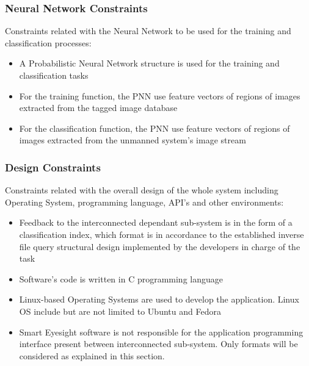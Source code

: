 \documentclass[12pt]{article}
\begin{document}
\subsubsection{Neural Network Constraints}
Constraints related with the Neural Network to be used for the
training and classification processes:
\begin{itemize}
\item A Probabilistic Neural Network structure is used for the
  training and classification tasks
\item For the training function, the PNN use feature vectors of
  regions of images extracted from the tagged image database
\item For the classification function, the PNN use feature vectors of
  regions of images extracted from the unmanned system's image stream
\end{itemize}

\subsubsection{Design Constraints}
Constraints related with the overall design of the whole system
including Operating System, programming language, API's and other
environments:
\begin{itemize}
\item Feedback to the interconnected dependant sub-system is in the
  form of a classification index, which format is in accordance to the
  established inverse file query structural design implemented by the
  developers in charge of the task
\item Software's code is written in C programming language
\item Linux-based Operating Systems are used to develop the
  application. Linux OS include but are not limited to Ubuntu and
  Fedora
\item Smart Eyesight software is not responsible for the application
  programming interface present between interconnected
  sub-system. Only formats will be considered as explained in this
  section.
\end{itemize}
\end{document}
